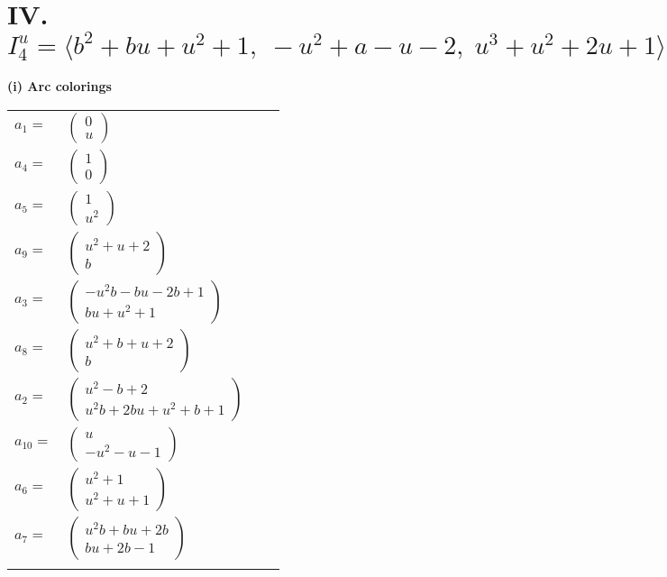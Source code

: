 \documentclass[1p]{elsarticle_modified}
\theoremstyle{definition}
\begin{document}
\centering \section*{IV. $I^u_{4}= \langle b^2+b u+u^2+1,\;- u^2+a- u-2,\;u^3+u^2+2 u+1 \rangle$}
\flushleft \textbf{(i) Arc colorings}\\
\begin{tabular}{m{7pt} m{180pt} m{7pt} m{180pt} }
\flushright $a_{1}=$&$\begin{pmatrix}0\\u\end{pmatrix}$ \\
\flushright $a_{4}=$&$\begin{pmatrix}1\\0\end{pmatrix}$ \\
\flushright $a_{5}=$&$\begin{pmatrix}1\\u^2\end{pmatrix}$ \\
\flushright $a_{9}=$&$\begin{pmatrix}u^2+u+2\\b\end{pmatrix}$ \\
\flushright $a_{3}=$&$\begin{pmatrix}- u^2 b- b u-2 b+1\\b u+u^2+1\end{pmatrix}$ \\
\flushright $a_{8}=$&$\begin{pmatrix}u^2+b+u+2\\b\end{pmatrix}$ \\
\flushright $a_{2}=$&$\begin{pmatrix}u^2- b+2\\u^2 b+2 b u+u^2+b+1\end{pmatrix}$ \\
\flushright $a_{10}=$&$\begin{pmatrix}u\\- u^2- u-1\end{pmatrix}$ \\
\flushright $a_{6}=$&$\begin{pmatrix}u^2+1\\u^2+u+1\end{pmatrix}$ \\
\flushright $a_{7}=$&$\begin{pmatrix}u^2 b+b u+2 b\\b u+2 b-1\end{pmatrix}$\\&\end{tabular}
\end{document}
